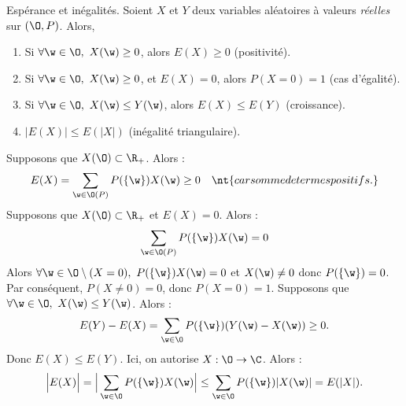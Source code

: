 \documentclass[11pt]{article}
\begin{document}
\begin{prop}{Espérance et inégalités.}{}
    Soient $X$ et $Y$ deux variables aléatoires à valeurs \emph{réelles} sur $(\O,P)$. Alors,
    \begin{enumerate}[topsep=0pt,itemsep=-0.9 ex]
        \item Si $\forall \w \in \O, ~ X(\w)\geq0$, alors $E(X)\geq0$ (positivité).
        \item Si $\forall \w \in \O, ~ X(\w)\geq0$, et $E(X)=0$, alors $P(X=0)=1$ (cas d'égalité).
        \item Si $\forall \w \in \O, ~ X(\w)\leq Y(\w)$, alors $E(X)\leq E(Y)$ (croissance).
        \item $|E(X)|\leq E(|X|)$ (inégalité triangulaire).
    \end{enumerate}
    \tcblower
     Supposons que $X(\O)\subset\R_+$. Alors :
    \begin{equation*}
        E(X)=\sum_{\w\in\O(P)}P(\{\w\})X(\w)\geq0 \quad \nt{car somme de termes positifs.}
    \end{equation*}
     Supposons que $X(\O)\subset\R_+$ et $E(X)=0$. Alors :
    \begin{equation*}
        \sum_{\w\in\O(P)}P(\{\w\})X(\w)=0
    \end{equation*}
    Alors $\forall \w\in\O\setminus(X=0), ~ P(\{\w\})X(\w)=0$ et $X(\w)\neq0$ donc $P(\{\w\})=0$.\\
    Par conséquent, $P(X\neq0)=0$, donc $P(X=0)=1$.\n
     Supposons que $\forall \w \in \O, ~ X(\w) \leq Y(\w)$. Alors :
    \begin{equation*}
        E(Y) - E(X) = \sum_{\w\in\O}P(\{\w\})(Y(\w)-X(\w))\geq0.
    \end{equation*}
    Donc $E(X)\leq E(Y)$.\n
     Ici, on autorise $X:\O\to\C$. Alors :
    \begin{equation*}
        \Big| E(X) \Big| = \Big| \sum_{\w\in\O}P(\{\w\})X(\w) \Big| \leq \sum_{\w\in\O}P(\{\w\})|X(\w)| = E(|X|).
    \end{equation*}
\end{prop}
\end{document}
